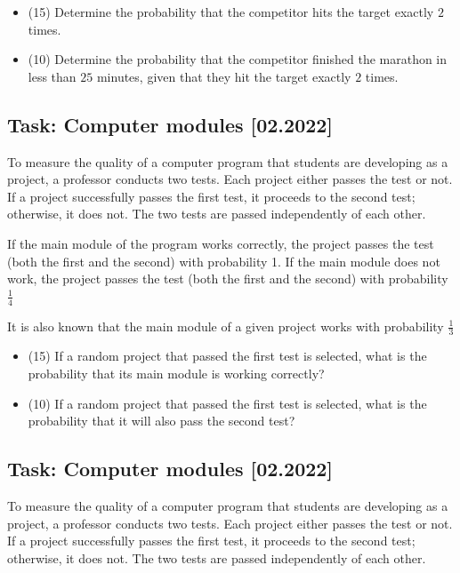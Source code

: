 \documentclass[a4paper, 12pt]{article}
\begin{document}
\begin{itemize}
    \item [a)] (15) Determine the probability that the competitor hits the target exactly $2$ times.
\item [b)] (10) Determine the probability that the competitor finished the marathon in less than $25$ minutes, given that they hit the target exactly $2$ times.
\end{itemize}




\subsection*{Task: Computer modules [02.2022]}

To measure the quality of a computer program that students are developing as a project, a professor conducts two tests. Each project either passes the test or not. If a project successfully passes the first test, it proceeds to the second test; otherwise, it does not.
The two tests are passed independently of each other.

If the main module of the program works correctly, the project passes the test (both the first and the second) with probability 1. If the main module does not work, the project passes the test (both the first and the second) with probability $\frac{1}{4}$

It is also known that the main module of a given project works with probability $\frac{1}{3}$

\begin{itemize}
    \item [a)] (15) If a random project that passed the first test is selected, what is the probability that its main module is working correctly?
    \item [b)] (10) If a random project that passed the first test is selected, what is the probability that it will also pass the second test?
\end{itemize}


\subsection*{Task: Computer modules [02.2022]}

To measure the quality of a computer program that students are developing as a project, a professor conducts two tests. Each project either passes the test or not. If a project successfully passes the first test, it proceeds to the second test; otherwise, it does not.
The two tests are passed independently of each other.
\end{document}
